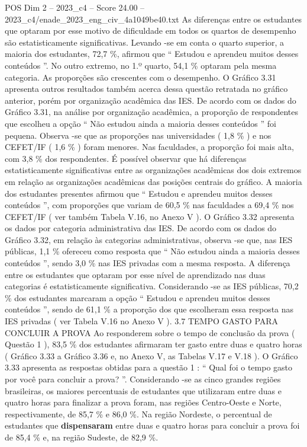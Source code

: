 \begin{textsample}{POS Dim 2 – 2023\_c4 – Score 24.00 – 2023\_c4/enade\_2023\_eng\_civ\_4a1049be40.txt}
As diferenças entre os estudantes que optaram por esse motivo de dificuldade em todos os quartos de desempenho são estatisticamente significativas.
Levando -se em conta o quarto superior, a maioria dos estudantes, 72,7 \%, afirmou que “ Estudou e aprendeu muitos desses conteúdos ”.
No outro extremo, no 1.º quarto, 54,1 \% optaram pela mesma categoria.
As proporções são crescentes com o desempenho.
O Gráfico 3.31 apresenta outros resultados também acerca dessa questão retratada no gráfico anterior, porém por organização acadêmica das IES.
De acordo com os dados do Gráfico 3.31, na análise por organização acadêmica, a proporção de respondentes que escolheu a opção “ Não estudou ainda a maioria desses conteúdos ” foi pequena.
Observa -se que as proporções nas universidades ( 1,8 \% ) e nos CEFET/IF ( 1,6 \% ) foram menores.
Nas faculdades, a proporção foi mais alta, com 3,8 \% dos respondentes.
É possível observar que há diferenças estatisticamente significativas entre as organizações acadêmicas dos dois extremos em relação as organizações acadêmicas das posições centrais do gráfico.
A maioria dos estudantes presentes afirmou que “ Estudou e aprendeu muitos desses conteúdos ”, com proporções que variam de 60,5 \% nas faculdades a 69,4 \% nos CEFET/IF ( ver também Tabela V.16, no Anexo V ).
O Gráfico 3.32 apresenta os dados por categoria administrativa das IES.
De acordo com os dados do Gráfico 3.32, em relação às categorias administrativas, observa -se que, nas IES públicas, 1,1 \% ofereceu como resposta que “ Não estudou ainda a maioria desses conteúdos ”, sendo 3,0 \% nas IES privadas com a mesma resposta.
A diferença entre os estudantes que optaram por esse nível de aprendizado nas duas categorias é estatisticamente significativa.
Considerando -se as IES públicas, 70,2 \% dos estudantes marcaram a opção “ Estudou e aprendeu muitos desses conteúdos ”, sendo de 61,1 \% a proporção dos que escolheram essa resposta nas IES privadas ( ver Tabela V.16 no Anexo V ). 3.7 TEMPO GASTO PARA CONCLUIR A PROVA Ao responderem sobre o tempo de conclusão da prova ( Questão 1 ), 83,5 \% dos estudantes afirmaram ter gasto entre duas e quatro horas ( Gráfico 3.33 a Gráfico 3.36 e, no Anexo V, as Tabelas V.17 e V.18 ).
O Gráfico 3.33 apresenta as respostas obtidas para a questão 1 : “ Qual foi o tempo gasto por você para concluir a prova? ”.
Considerando -se as cinco grandes regiões brasileiras, os maiores percentuais de estudantes que utilizaram entre duas e quatro horas para finalizar a prova foram, nas regiões Centro-Oeste e Norte, respectivamente, de 85,7 \% e 86,0 \%.
Na região Nordeste, o percentual de estudantes que \textbf{dispensaram} entre duas e quatro horas para concluir a prova foi de 85,4 \% e, na região Sudeste, de 82,9 \%.

\end{textsample}
